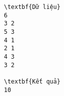 \begin{verbatim}
\textbf{Dữ liệu}
6 
3 2 
5 3 
4 1 
2 1 
4 3 
3 2

\textbf{Kết quả}
10
\end{verbatim}
